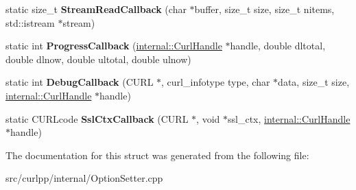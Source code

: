 \begin{DoxyCompactItemize}
\item 
\hypertarget{structcurlpp_1_1internal_1_1Callbacks_a7ab93128d1b912af0fac7a3845768eed}{static size\-\_\-t {\bfseries Stream\-Read\-Callback} (char $\ast$buffer, size\-\_\-t size, size\-\_\-t nitems, std\-::istream $\ast$stream)}\label{structcurlpp_1_1internal_1_1Callbacks_a7ab93128d1b912af0fac7a3845768eed}

\item 
\hypertarget{structcurlpp_1_1internal_1_1Callbacks_aca7773bc439f657959311f11f73b1396}{static int {\bfseries Progress\-Callback} (\hyperlink{classcurlpp_1_1internal_1_1CurlHandle}{internal\-::\-Curl\-Handle} $\ast$handle, double dltotal, double dlnow, double ultotal, double ulnow)}\label{structcurlpp_1_1internal_1_1Callbacks_aca7773bc439f657959311f11f73b1396}

\item 
\hypertarget{structcurlpp_1_1internal_1_1Callbacks_ab09b4081b01ef53c602643b68c7c3ddb}{static int {\bfseries Debug\-Callback} (C\-U\-R\-L $\ast$, curl\-\_\-infotype type, char $\ast$data, size\-\_\-t size, \hyperlink{classcurlpp_1_1internal_1_1CurlHandle}{internal\-::\-Curl\-Handle} $\ast$handle)}\label{structcurlpp_1_1internal_1_1Callbacks_ab09b4081b01ef53c602643b68c7c3ddb}

\item 
\hypertarget{structcurlpp_1_1internal_1_1Callbacks_ad62a0abad12fb7d3e25ead35b500973a}{static C\-U\-R\-Lcode {\bfseries Ssl\-Ctx\-Callback} (C\-U\-R\-L $\ast$, void $\ast$ssl\-\_\-ctx, \hyperlink{classcurlpp_1_1internal_1_1CurlHandle}{internal\-::\-Curl\-Handle} $\ast$handle)}\label{structcurlpp_1_1internal_1_1Callbacks_ad62a0abad12fb7d3e25ead35b500973a}

\end{DoxyCompactItemize}


The documentation for this struct was generated from the following file\-:\begin{DoxyCompactItemize}
\item 
src/curlpp/internal/Option\-Setter.\-cpp\end{DoxyCompactItemize}
